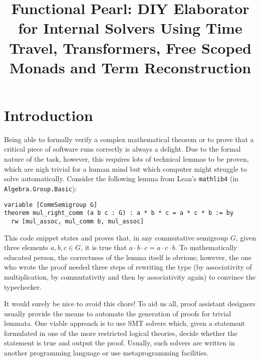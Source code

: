 \documentclass[manuscript,screen,review]{acmart}
\begin{document}
\title{Functional Pearl: DIY Elaborator for Internal Solvers
  Using Time Travel, Transformers, Free Scoped Monads and Term Reconstruction}

%

\maketitle

\section{Introduction} \label{intro}

Being able to formally verify a complex mathematical theorem or to prove that a
critical piece of software runs correctly is always a delight. Due to the formal
nature of the task, however, this requires lots of technical lemmas to be
proven, which are nigh trivial for a human mind but which computer might
struggle to solve automatically. Consider the following lemma from Lean's
\texttt{mathlib4} (in \texttt{Algebra.Group.Basic}):

\begin{lstlisting}[language=Lean]
variable [CommSemigroup G]
theorem mul_right_comm (a b c : G) : a * b * c = a * c * b := by
  rw [mul_assoc, mul_comm b, mul_assoc]
\end{lstlisting}

This code snippet states and proves that, in any commutative semigroup $G$,
given three elements $a, b, c \in G$, it is true that $a\cdot b\cdot c
=a\cdot c\cdot b$. To mathematically educated person, the correctness of the
lemma itself is obvious; however, the one who wrote the proof needed three steps
of rewriting the type (by associativity of multiplication, by commutativity and
then by associativity again) to convince the typechecker.

It would surely be nice to avoid this chore! To aid us all, proof assistant
designers usually provide the means to automate the generation of proofs for
trivial lemmata. One viable approach is to use SMT solvers which, given a
statement formulated in one of the more restricted logical theories, decide
whether the statement is true and output the proof. Usually, such solvers are
written in another programming language or use metaprogramming facilities.
\end{document}
